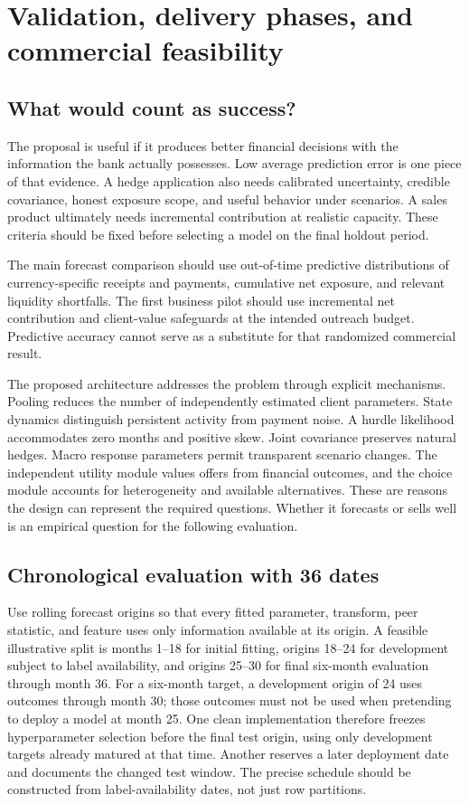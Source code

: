 \chapter{Validation, delivery phases, and commercial feasibility}
\label{ch:delivery}
\section{What would count as success?}
The proposal is useful if it produces better financial decisions with the information the bank actually possesses. Low average prediction error is one piece of that evidence. A hedge application also needs calibrated uncertainty, credible covariance, honest exposure scope, and useful behavior under scenarios. A sales product ultimately needs incremental contribution at realistic capacity. These criteria should be fixed before selecting a model on the final holdout period.

The main forecast comparison should use out-of-time predictive distributions of currency-specific receipts and payments, cumulative net exposure, and relevant liquidity shortfalls. The first business pilot should use incremental net contribution and client-value safeguards at the intended outreach budget. Predictive accuracy cannot serve as a substitute for that randomized commercial result.

The proposed architecture addresses the problem through explicit mechanisms. Pooling reduces the number of independently estimated client parameters. State dynamics distinguish persistent activity from payment noise. A hurdle likelihood accommodates zero months and positive skew. Joint covariance preserves natural hedges. Macro response parameters permit transparent scenario changes. The independent utility module values offers from financial outcomes, and the choice module accounts for heterogeneity and available alternatives. These are reasons the design can represent the required questions. Whether it forecasts or sells well is an empirical question for the following evaluation.

\section{Chronological evaluation with 36 dates}
Use rolling forecast origins so that every fitted parameter, transform, peer statistic, and feature uses only information available at its origin. A feasible illustrative split is months 1--18 for initial fitting, origins 18--24 for development subject to label availability, and origins 25--30 for final six-month evaluation through month 36. For a six-month target, a development origin of 24 uses outcomes through month 30; those outcomes must not be used when pretending to deploy a model at month 25. One clean implementation therefore freezes hyperparameter selection before the final test origin, using only development targets already matured at that time. Another reserves a later deployment date and documents the changed test window. The precise schedule should be constructed from label-availability dates, not just row partitions.

